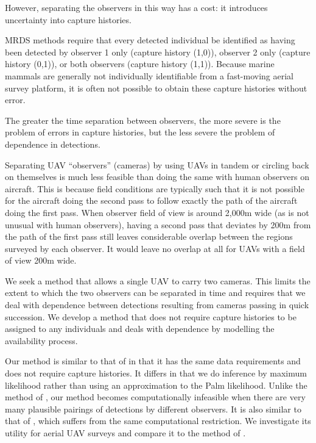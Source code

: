 \documentclass[useAMS, usenatbib, referee]{biom}\usepackage[]{graphicx}\usepackage[]{color}
\begin{document}
However, separating the observers in this way has a cost: it introduces uncertainty into capture histories.

MRDS methods require that every detected individual be identified as having been detected by observer 1 only (capture history (1,0)), observer 2 only (capture history (0,1)), or both observers (capture history (1,1)). Because marine mammals are generally not individually identifiable from a fast-moving aerial survey platform, it is often not possible to obtain these capture histories without error. 

The greater the time separation between observers, the more severe is the problem of errors in capture histories, but the less severe the problem of dependence in detections.

Separating UAV ``observers'' (cameras) by using UAVs in tandem or circling back on themselves is much less feasible than doing the same with human observers on aircraft. This is because field conditions are typically such that it is not possible for the aircraft doing the second pass to follow exactly the path of the aircraft doing the first pass. When observer field of view is around 2,000m wide (as is not unusual with human observers), having a second pass that deviates by 200m from the path of the first pass still leaves considerable overlap between the regions surveyed by each observer. It would leave no overlap at all for UAVs with a field of view 200m wide. 

We seek a method that allows a single UAV to carry two cameras. This limits the extent to which the two observers can be separated in time and requires that we deal with dependence between detections resulting from cameras passing in quick succession. We develop a method that does not require capture histories to be assigned to any individuals and deals with dependence by modelling the availability process. 

Our method is similar to that of \cite{Stevenson+al:18} in that it has the same data requirements and does not require capture histories. It differs in that we do inference by maximum likelihood rather than using an approximation to the Palm likelihood. Unlike the method of \cite{Stevenson+al:18}, our method becomes computationally infeasible when there are very many plausible pairings of detections by different observers. It is also similar to that of \cite{Hiby+Lovell:98}, which suffers from the same computational restriction. We investigate its utility for aerial UAV surveys and compare it to the method of \cite{Stevenson+al:18}. 
\end{document}
